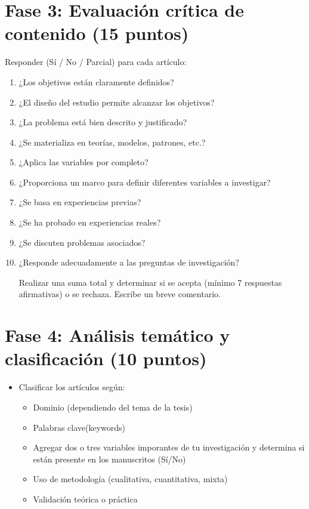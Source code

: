 \documentclass[12pt]{article}
\begin{document}
\section*{Fase 3: Evaluación crítica de contenido (15 puntos)}
Responder (Sí / No / Parcial) para cada artículo:
\begin{enumerate}[label=\arabic*.]
  \item ¿Los objetivos están claramente definidos?
  \item ¿El diseño del estudio permite alcanzar los objetivos?
  \item ¿La problema está bien descrito y justificado?
  \item ¿Se materializa en teorías, modelos, patrones, etc.?
  \item ¿Aplica las variables por completo?
  \item ¿Proporciona un marco para definir diferentes variables a investigar?
  \item ¿Se basa en experiencias previas?
  \item ¿Se ha probado en experiencias reales?
  \item ¿Se discuten problemas asociados?
  \item ¿Responde adecuadamente a las preguntas de investigación?
  
  \begin{tcolorbox}[colback=yellow!20!white,colframe=black,title=Comentario]
  Realizar una suma total y determinar si se acepta (mínimo 7 respuestas afirmativas) o se rechaza. Escribe un breve comentario.
    \end{tcolorbox}
\end{enumerate}

\section*{Fase 4: Análisis temático y clasificación (10 puntos)}
\begin{itemize}
  \item Clasificar los artículos según:
  \begin{itemize}
    \item Dominio (dependiendo del tema de la tesis)
    \item Palabras clave(keywords)
    \item Agregar dos o tres variables imporantes de tu investigación y determina si están presente en los manuscritos (Sí/No)
    \item Uso de metodología (cualitativa, cuantitativa, mixta)
    \item Validación teórica o práctica
  \end{itemize}
\end{itemize}
\end{document}
